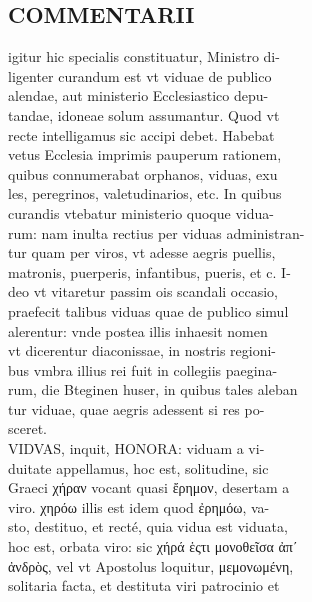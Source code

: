 \documentclass{article}
\begin{document}
\begin{pages}
\section*{COMMENTARII \\
                }
igitur hic specialis constituatur, Ministro di- \\
                ligenter curandum est vt viduae de publico \\
                alendae, aut ministerio Ecclesiastico depu- \\
                tandae, idoneae solum assumantur. Quod vt \\
                recte intelligamus sic accipi debet. Habebat \\
                vetus Ecclesia imprimis pauperum rationem, \\
                quibus connumerabat orphanos, viduas, exu \\
                les, peregrinos, valetudinarios, etc. In quibus \\
                curandis vtebatur ministerio quoque vidua- \\
                rum: nam inulta rectius per viduas administran- \\
                tur quam per viros, vt adesse aegris puellis, \\
                matronis, puerperis, infantibus, pueris, et c. I- \\
                deo vt vitaretur passim ois scandali occasio, \\
                praefecit talibus viduas quae de publico simul \\
                alerentur: vnde postea illis inhaesit nomen \\
                vt dicerentur diaconissae, in nostris regioni- \\
                bus vmbra illius rei fuit in collegiis paegina- \\
                rum, die Bteginen huser, in quibus tales aleban \\
                tur viduae, quae aegris adessent si res po- \\
                sceret. \\
                VIDVAS, inquit, HONORA: viduam a vi- \\
                duitate appellamus, hoc est, solitudine, sic \\
                Graeci χήραν vocant quasi ἔρημον, desertam a \\
                viro. χηρόω illis est idem quod ἐρημόω, va- \\
                sto, destituo, et recté, quia vidua est viduata, \\
                hoc est, orbata viro: sic χήρά ἑςτι  μονοθεῖσα ἀπʹ \\
                ἀνδρὸς, vel vt Apostolus loquitur, μεμονωμένη, \\
                solitaria facta, et destituta viri patrocinio et \\
                

\end{pages}
\end{document}
